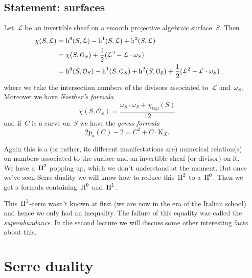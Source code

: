 \documentclass[10pt,a4paper]{article}
\begin{document}
\subsection{Statement: surfaces}
\label{subsection:statement-surfaces}
\begin{theorem}
  \label{theorem:riemann-roch-surfaces}
  Let~$\mathcal{L}$ be an invertible sheaf on a smooth projective algebraic surface~$S$. Then
  \begin{equation}
    \begin{aligned}
    \chi(S,\mathcal{L})&=\operatorname{h}^0(S,\mathcal{L})-\operatorname{h}^1(S,\mathcal{L})+\operatorname{h}^2(S,\mathcal{L}) \\
    &=\chi(S,\mathcal{O}_S)+\frac{1}{2}(\mathcal{L}^2-\mathcal{L}\cdot\omega_S) \\
    &=\operatorname{h}^0(S,\mathcal{O}_S)-\operatorname{h}^1(S,\mathcal{O}_S)+\operatorname{h}^2(S,\mathcal{O_S})+\frac{1}{2}(\mathcal{L}^2-\mathcal{L}\cdot\omega_S)
    \end{aligned}
  \end{equation}
  where we take the intersection numbers of the divisors associated to~$\mathcal{L}$ and~$\omega_S$. Moreover we have \emph{Noether's formula}
  \begin{equation}
    \chi(S,\mathcal{O}_S)=\frac{\omega_S\cdot\omega_S+\chi_{\mathrm{top}}(S)}{12}
  \end{equation}
  and if~$C$ is a curve on~$S$ we have the \emph{genus formula}
  \begin{equation}
    2\mathrm{p}_{\mathrm{a}}(C)-2=C^2+C\cdot\mathrm{K}_X.
  \end{equation}
\end{theorem}
Again this is a (or rather, its different manifestations are) numerical relation(s) on numbers associated to the surface and an invertible sheaf (or divisor) on it. We have a~$\operatorname{H}^2$ popping up, which we don't understand at the moment. But once we've seen Serre duality we will know how to reduce this~$\operatorname{H}^2$ to a~$\operatorname{H}^0$. Then we get a formula containing~$\operatorname{H}^0$ and~$\operatorname{H}^1$.

This~$\operatorname{H}^1$-term wasn't known at first (we are now in the era of the Italian school) and hence we only had an inequality. The failure of this equality was called the \emph{superabundance}. In the second lecture we will discuss some other interesting facts about this.


\section{Serre duality}
\label{section:serre-duality}
\end{document}

